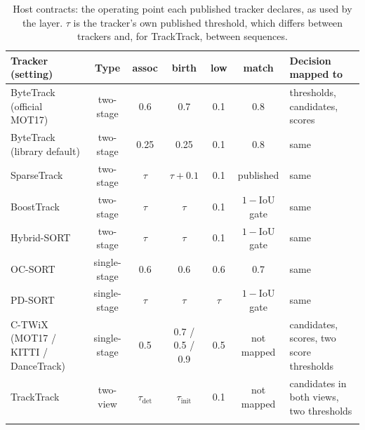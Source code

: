 \begin{table}[t]
\centering
\caption{Host contracts: the operating point each published tracker declares, as used by the layer. $\tau$ is the tracker's own published threshold, which differs between trackers and, for TrackTrack, between sequences.}
\label{tab:contracts}
\footnotesize
\begin{tabular}{p{3.4cm}cccccp{3.6cm}}
\hline
Tracker (setting) & Type & assoc & birth & low & match & Decision mapped to \\
\hline
ByteTrack (official MOT17) & two-stage & 0.6 & 0.7 & 0.1 & 0.8 & thresholds, candidates, scores \\
ByteTrack (library default) & two-stage & 0.25 & 0.25 & 0.1 & 0.8 & same \\
SparseTrack & two-stage & $\tau$ & $\tau+0.1$ & 0.1 & published & same \\
BoostTrack & two-stage & $\tau$ & $\tau$ & 0.1 & $1-$IoU gate & same \\
Hybrid-SORT & two-stage & $\tau$ & $\tau$ & 0.1 & $1-$IoU gate & same \\
OC-SORT & single-stage & 0.6 & 0.6 & 0.6 & 0.7 & same \\
PD-SORT & single-stage & $\tau$ & $\tau$ & $\tau$ & $1-$IoU gate & same \\
C-TWiX (MOT17 / KITTI / DanceTrack) & single-stage & 0.5 & 0.7 / 0.5 / 0.9 & 0.5 & not mapped & candidates, scores, two score thresholds \\
TrackTrack & two-view & $\tau_{\mathrm{det}}$ & $\tau_{\mathrm{init}}$ & 0.1 & not mapped & candidates in both views, two thresholds \\
\botrule
\end{tabular}
\end{table}

